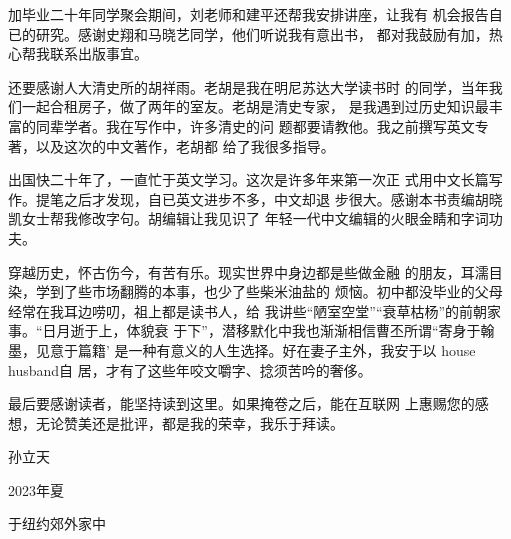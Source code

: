 加毕业二十年同学聚会期间，刘老师和建平还帮我安排讲座，让我有%
机会报告自已的研究。感谢史翔和马晓艺同学，他们听说我有意出书，%
都对我鼓励有加，热心帮我联系出版事宜。%
\par
还要感谢人大清史所的胡祥雨。老胡是我在明尼苏达大学读书时%
的同学，当年我们一起合租房子，做了两年的室友。老胡是清史专家，%
是我遇到过历史知识最丰富的同辈学者。我在写作中，许多清史的问%
题都要请教他。我之前撰写英文专著，以及这次的中文著作，老胡都%
给了我很多指导。%
\par
出国快二十年了，一直忙于英文学习。这次是许多年来第一次正%
式用中文长篇写作。提笔之后才发现，自已英文进步不多，中文却退%
步很大。感谢本书责编胡晓凯女士帮我修改字句。胡编辑让我见识了%
年轻一代中文编辑的火眼金睛和字词功夫。%
\par
穿越历史，怀古伤今，有苦有乐。现实世界中身边都是些做金融%
的朋友，耳濡目染，学到了些市场翻腾的本事，也少了些柴米油盐的%
烦恼。初中都没毕业的父母经常在我耳边唠叨，祖上都是读书人，给%
我讲些“陋室空堂”“衰草枯杨”的前朝家事。“日月逝于上，体貌衰%
于下”，潜移默化中我也渐渐相信曹丕所谓“寄身于翰墨，见意于篇籍’%
是一种有意义的人生选择。好在妻子主外，我安于以 house husband自%
居，才有了这些年咬文嚼字、捻须苦吟的奢侈。%
\par
最后要感谢读者，能坚持读到这里。如果掩卷之后，能在互联网%
上惠赐您的感想，无论赞美还是批评，都是我的荣幸，我乐于拜读。%
\par
孙立天%
\par
2023年夏%
\par
于纽约郊外家中%
